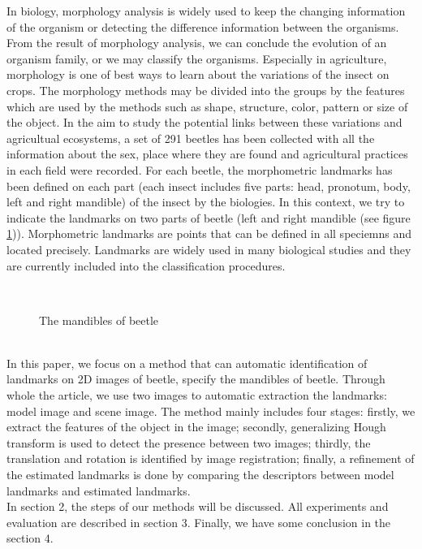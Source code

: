 \documentclass[twoside,twocolumn,10pt]{article}
\begin{document}
In biology, morphology analysis is widely used to keep the changing information of the organism or detecting the difference information between the organisms. From the result of morphology analysis, we can conclude the evolution of an organism family, or we may classify the organisms. Especially in agriculture, morphology is one of best ways to learn about the variations of the insect on crops. The morphology methods may be divided into the groups by the features which are used by the methods such as shape, structure, color, pattern or size of the object. In the aim to study the potential links between these variations and agricultual ecosystems, a set of 291 beetles has been collected with all the information about the sex, place where they are found and agricultural practices in each field were recorded. For each beetle, the morphometric landmarks has been defined on each part (each insect includes five parts: head, pronotum, body, left and right mandible) of the insect by the biologies. In this context, we try to indicate the landmarks on two parts of beetle (left and right mandible (see figure \ref{figparts})). Morphometric landmarks are points that can be defined in all speciemns and located precisely. Landmarks are widely used in many biological studies and they are currently included into the classification procedures.\\[0.2cm]
\begin{figure}[h]
\centering
{}~~
\caption{The mandibles of beetle}
\label{figparts}
\end{figure}~\\[0.2cm]
In this paper, we focus on a method that can automatic identification of landmarks on 2D images of beetle, specify the mandibles of beetle. Through whole the article, we use two images to automatic extraction the landmarks: model image and scene image. The method mainly includes four stages: firstly, we extract the features of the object in the image; secondly, generalizing Hough transform is used to detect the presence between two images; thirdly, the translation and rotation is identified by image registration; finally, a refinement of the estimated landmarks is done by comparing the descriptors  between model landmarks and estimated landmarks.\\[0.2cm]
In section 2, the steps of our methods will be discussed. All experiments and evaluation are described in section 3. Finally, we have some conclusion in the section 4.
\end{document}
